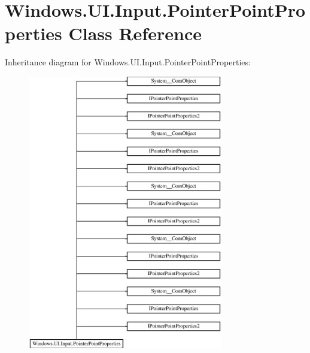 \hypertarget{class_windows_1_1_u_i_1_1_input_1_1_pointer_point_properties}{}\section{Windows.\+U\+I.\+Input.\+Pointer\+Point\+Properties Class Reference}
\label{class_windows_1_1_u_i_1_1_input_1_1_pointer_point_properties}
Inheritance diagram for Windows.\+U\+I.\+Input.\+Pointer\+Point\+Properties\+:\begin{figure}[H]
\begin{center}
\leavevmode
\includegraphics[height=12.000000cm]{class_windows_1_1_u_i_1_1_input_1_1_pointer_point_properties}
\end{center}
\end{figure}
